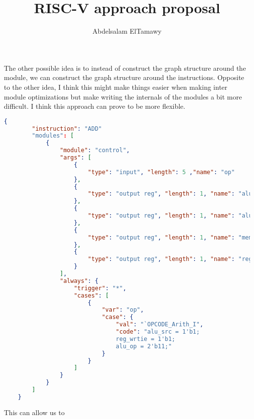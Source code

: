 \documentclass[]{article}
\title{RISC-V approach proposal}
\author{Abdelsalam ElTamawy}
\begin{document}
The other possible idea is to instead of construct the graph structure around the module, we can construct the graph structure around the instructions.
Opposite to the other idea, I think this might make things easier when making inter module optimizations but make writing the internals of the modules a bit more difficult.
I think this approach can prove to be more flexible.

	\begin{lstlisting}[language=json]
	{
		"instruction": "ADD"
		"modules": [
			{
				"module": "control",
				"args": [
					{
						"type": "input", "length": 5 ,"name": "op"
					},
					{
						"type": "output reg", "length": 1, "name": "alu_op"
					},
					{
						"type": "output reg", "length": 1, "name": "alu_src"
					},
					{
						"type": "output reg", "length": 1, "name": "mem_to_reg"
					},
					{
						"type": "output reg", "length": 1, "name": "reg_write"
					}
				],
				"always": {
					"trigger": "*",
					"cases": [
						{
							"var": "op",
							"case": {
								"val": "`OPCODE_Arith_I",
								"code": "alu_src = 1'b1;
								reg_wrtie = 1'b1;
								alu_op = 2'b11;"
							}
						}
					]
				}
			}
		]
	}		
	\end{lstlisting}

	This can allow us to 
\end{document}
